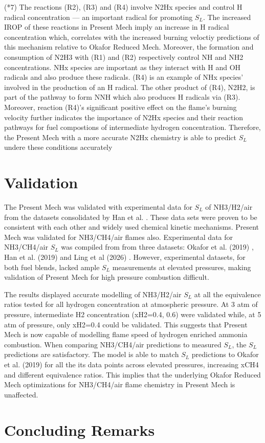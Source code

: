 \documentclass[10pt,twocolumn]{icfd2026paper}
\begin{document}
(*7) The reactions (R2), (R3) and (R4) involve N2Hx species and control H radical concentration --- an important radical for promoting $S_L$. The increased IROP of these reactions in Present Mech imply an increase in H radical concentration which, correlates with the increased burning veloctiy predictions of this mechanism relative to Okafor Reduced Mech. Moreover, the formation and consumption of N2H3 with (R1) and (R2) respectively control NH and NH2 concentrations. NHx species are important as they interact with H and OH radicals and also produce these radicals. (R4) is an example of NHx species' involved in the production of an H radical. The other product of (R4), N2H2, is part of the pathway to form NNH which also produces H radicals via (R3). Moreover, reaction (R4)'s significant positive effect on the flame's burning velocity further indicates the importance of N2Hx species and their reaction pathways for fuel compostions of intermediate hydrogen concentration. Therefore, the Present Mech with a more accurate N2Hx chemistry is able to predict $S_L$ undere these conditions accurately

\section{Validation}

The Present Mech was validated with experimental data for $S_L$ of NH3/H2/air from the datasets consolidated by Han et al. \cite{hannovel2026}. These data sets were proven to be consistent with each other and widely used chemical kinetic mechanisms. Present Mech was validated for NH3/CH4/air flames also. Experimental data for NH3/CH4/air $S_L$ was compiled from from three datasets: Okafor et al. (2019) \cite{okaforMeasurement2019}, Han et al. (2019) \cite{hanExperimental2019} and Ling et al (2026) \cite{lingExperimental2026}. However, experimental datasets, for both fuel blends, lacked ample $S_L$ measurements at elevated pressures, making validation of Present Mech for high pressure combustion difficult.

The results displayed accurate modelling of NH3/H2/air $S_L$ at all the equivalence ratios tested for all hydrogen concentration at atmospheric pressure. At 3 atm of pressure, intermediate H2 concentration (xH2=0.4, 0.6) were validated while, at 5 atm of pressure, only xH2=0.4 could be validated. This suggests that Present Mech is now capable of modelling flame speed of hydrogen enriched ammonia combustion. When comparing NH3/CH4/air predictions to measured $S_L$, the $S_L$ predictions are satisfactory. The model is able to match $S_L$ predictions to Okafor et al. (2019) \cite{okaforMeasurement2019} for all the its data points across elevated pressures, increasing xCH4 and different equivalence ratios. This implies that the underlying Okafor Reduced Mech optimizations for NH3/CH4/air flame chemistry in Present Mech is unaffected.

\section{Concluding Remarks}



\printbibliography
\end{document}
